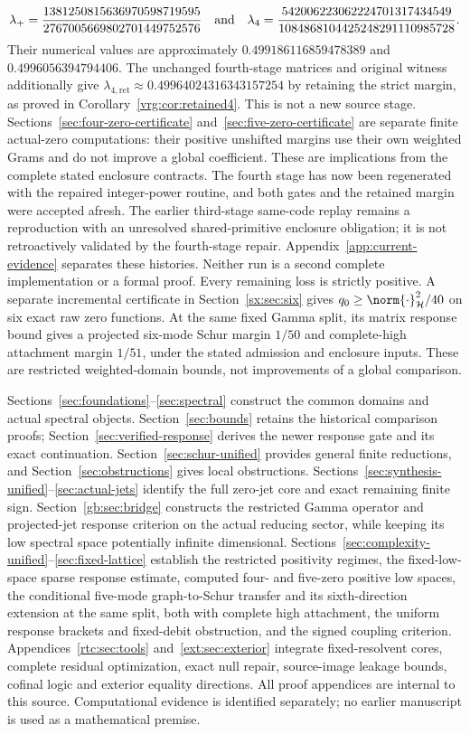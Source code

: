 \documentclass[11pt,a4paper]{article}
\numberwithin{equation}{section}
\theoremstyle{definition}\newtheorem{definition}[theorem]{Definition}
\theoremstyle{remark}\newtheorem{remark}[theorem]{Remark}
\newcommand{\Hh}{\mathcal H}\newcommand{\Hw}{\mathcal H}
\begin{document}
\[
 \lambda_+=\frac{1381250815636970598719595}{2767005669802701449752576}
 \quad\hbox{and}\quad
 \lambda_4=\frac{542006223062224701317434549}{1084868104425248291110985728}.
\]
Their numerical values are approximately $0.499186116859478389$ and $0.4996056394794406$. The unchanged fourth-stage matrices and original witness additionally give $\lambda_{4,\mathrm{ret}}\approx0.49964024316343157254$ by retaining the strict margin, as proved in Corollary~\ref{vrg:cor:retained4}. This is not a new source stage. Sections~\ref{sec:four-zero-certificate} and~\ref{sec:five-zero-certificate} are separate finite actual-zero computations: their positive unshifted margins use their own weighted Grams and do not improve a global coefficient. These are implications from the complete stated enclosure contracts. The fourth stage has now been regenerated with the repaired integer-power routine, and both gates and the retained margin were accepted afresh. The earlier third-stage same-code replay remains a reproduction with an unresolved shared-primitive enclosure obligation; it is not retroactively validated by the fourth-stage repair. Appendix~\ref{app:current-evidence} separates these histories. Neither run is a second complete implementation or a formal proof. Every remaining loss is strictly positive. A separate incremental certificate in Section~\ref{sx:sec:six}
gives $q_0\ge\norm{\cdot}_{\Hh}^2/40$ on six exact raw zero functions.
At the same fixed Gamma split, its matrix response bound gives a projected
six-mode Schur margin $1/50$ and complete-high attachment margin $1/51$,
under the stated admission and enclosure inputs. These are restricted
weighted-domain bounds, not improvements of a global comparison.

Sections~\ref{sec:foundations}--\ref{sec:spectral} construct the common domains and actual spectral objects. Section~\ref{sec:bounds} retains the historical comparison proofs; Section~\ref{sec:verified-response} derives the newer response gate and its exact continuation. Section~\ref{sec:schur-unified} provides general finite reductions, and Section~\ref{sec:obstructions} gives local obstructions. Sections~\ref{sec:synthesis-unified}--\ref{sec:actual-jets} identify the full zero-jet core and exact remaining finite sign. Section~\ref{gb:sec:bridge} constructs the restricted Gamma operator and projected-jet response criterion on the actual reducing sector, while keeping its low spectral space potentially infinite dimensional. Sections~\ref{sec:complexity-unified}--\ref{sec:fixed-lattice} establish the restricted positivity regimes, the fixed-low-space sparse response estimate, computed four- and five-zero positive low spaces, the conditional five-mode graph-to-Schur transfer and its sixth-direction extension at the same split, both with complete high attachment, the uniform response brackets and fixed-debit obstruction, and the signed coupling criterion. Appendices~\ref{rtc:sec:tools} and~\ref{ext:sec:exterior} integrate fixed-resolvent cores, complete residual optimization, exact null repair, source-image leakage bounds, cofinal logic and exterior equality directions. All proof appendices are internal to this source. Computational evidence is identified separately; no earlier manuscript is used as a mathematical premise.
\end{document}
